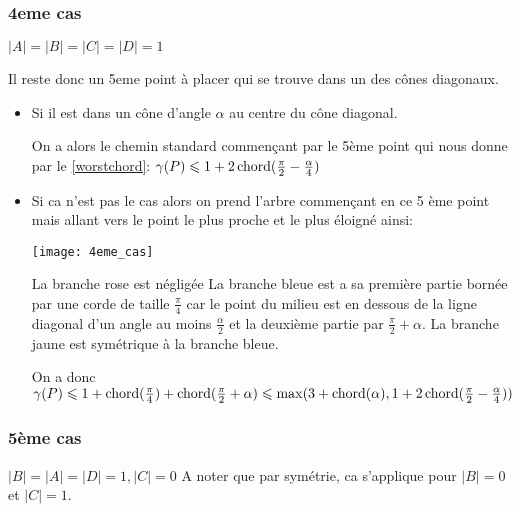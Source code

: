 \subsubsection*{4eme cas}\label{4cas} $|A| = |B| = |C| = |D| = 1$

Il reste donc un 5eme point à placer qui se trouve dans un des cônes diagonaux.

\begin{itemize}

\item \label{4cas1} Si il est dans un cône d'angle $\alpha$ au centre du cône diagonal.

On a alors le chemin standard commençant par le 5ème point qui nous donne par le \cref{worstchord}: $\gamma(P) \leqslant 1 + 2\operatorname{chord}(\frac{\pi}{2} - \frac{\alpha}{4})$

\item \label{4cas2} Si ca n'est pas le cas alors on prend l'arbre commençant en ce 5 ème point mais allant vers le point le plus proche et le plus éloigné ainsi:

  \texttt{[image: 4eme\_cas]}\label{fig:4eme_cas}

La branche rose est négligée
La branche bleue est a sa première partie bornée par une corde de taille $\frac{\pi}{4}$ car le point du milieu est en dessous de la ligne diagonal d'un angle au moins $\frac{\alpha}{2}$ et la deuxième partie par $\frac{\pi}{2} + \alpha$.
La branche jaune est symétrique à la branche bleue.

On a donc $\gamma(P) \leqslant 1 + \operatorname{chord}(\frac{\pi}{4}) + \operatorname{chord}(\frac{\pi}{2} + \alpha) \leqslant \max(3 + \operatorname{chord}(\alpha), 1 + 2\operatorname{chord}(\frac{\pi}{2} - \frac{\alpha}{4}))$

\end{itemize}

\subsubsection*{5ème cas}\label{5cas} $|B| = |A| = |D| = 1, |C| = 0$
A noter que par symétrie, ca s'applique pour $|B| = 0$ et $|C| = 1$.

